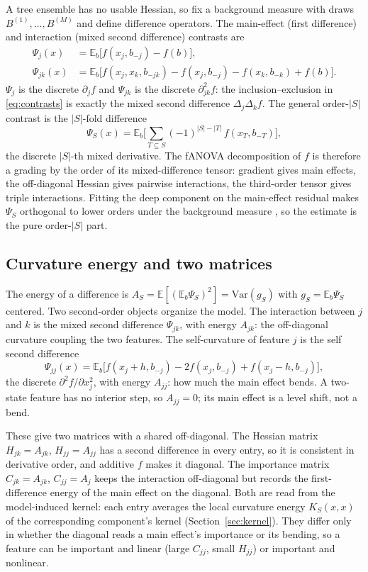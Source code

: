 \documentclass[11pt]{article}
\newcommand{\E}{\mathbb{E}}
\newcommand{\D}{\Delta}
\begin{document}
A tree ensemble has no usable Hessian, so fix a background measure with draws
$B^{(1)},\dots,B^{(M)}$ and define difference operators. The main-effect (first
difference) and interaction (mixed second difference) contrasts are
\begin{align}
 \Psi_j(x)   &= \E_b\!\big[f(x_j,b_{-j})-f(b)\big],\\
 \Psi_{jk}(x)&= \E_b\!\big[f(x_j,x_k,b_{-jk})-f(x_j,b_{-j})-f(x_k,b_{-k})+f(b)\big].
\label{eq:contrasts}
\end{align}
$\Psi_j$ is the discrete $\partial_j f$ and $\Psi_{jk}$ is the discrete
$\partial^2_{jk}f$: the inclusion--exclusion in \eqref{eq:contrasts} is exactly
the mixed second difference $\D_j\D_k f$. The general order-$|S|$ contrast is the
$|S|$-fold difference
\begin{equation}
 \Psi_S(x)=\E_b\Big[\textstyle\sum_{T\subseteq S}(-1)^{|S|-|T|}\,f(x_T,b_{-T})\Big],
\label{eq:contrastS}
\end{equation}
the discrete $|S|$-th mixed derivative. The fANOVA decomposition of $f$ is
therefore a grading by the order of its mixed-difference tensor: gradient gives
main effects, the off-diagonal Hessian gives pairwise interactions, the
third-order tensor gives triple interactions. Fitting the deep component on the
main-effect residual makes $\Psi_S$ orthogonal to lower orders under the
background measure \cite{Hu2023}, so the estimate is the pure order-$|S|$ part.

\subsection{Curvature energy and two matrices}

The energy of a difference is $A_S=\E[(\E_b\Psi_S)^2]=\mathrm{Var}(g_S)$ with
$g_S=\E_b\Psi_S$ centered. Two second-order objects organize the model. The
interaction between $j$ and $k$ is the mixed second difference $\Psi_{jk}$, with
energy $A_{jk}$: the off-diagonal curvature coupling the two features. The
self-curvature of feature $j$ is the self second difference
\begin{equation}
 \Psi_{jj}(x)=\E_b\!\big[f(x_j{+}h,b_{-j})-2f(x_j,b_{-j})+f(x_j{-}h,b_{-j})\big],
\end{equation}
the discrete $\partial^2 f/\partial x_j^2$, with energy $A_{jj}$: how much the
main effect bends. A two-state feature has no interior step, so $A_{jj}=0$; its
main effect is a level shift, not a bend.

These give two matrices with a shared off-diagonal. The Hessian matrix
$H_{jk}=A_{jk}$, $H_{jj}=A_{jj}$ has a second difference in every entry, so it is
consistent in derivative order, and additive $f$ makes it diagonal. The importance
matrix $C_{jk}=A_{jk}$, $C_{jj}=A_j$ keeps the interaction off-diagonal but records
the first-difference energy of the main effect on the diagonal. Both are read from
the model-induced kernel: each entry averages the local curvature energy
$K_S(x,x)$ of the corresponding component's kernel (Section~\ref{sec:kernel}).
They differ only in whether the diagonal reads a main effect's importance or its
bending, so a feature can be important and linear (large $C_{jj}$, small $H_{jj}$)
or important and nonlinear.
\end{document}
